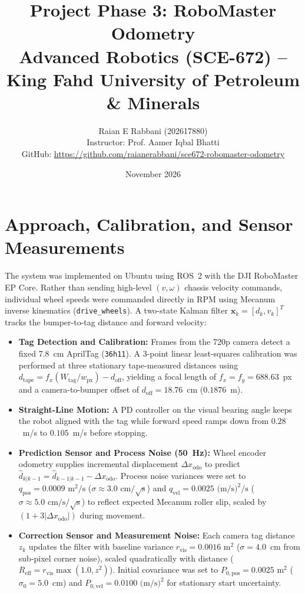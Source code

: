 \documentclass[10pt,a4paper]{article}
\title{\textbf{Project Phase 3: RoboMaster Odometry}\\[0.2em]
\normalsize Advanced Robotics (SCE-672) -- King Fahd University of Petroleum \& Minerals}
\author{Raian E Rabbani (202617880) \\
\small Instructor: Prof. Aamer Iqbal Bhatti \\
\small GitHub: \url{https://github.com/raianerabbani/sce672-robomaster-odometry}}
\date{November 2026}
\begin{document}
\maketitle

\section{Approach, Calibration, and Sensor Measurements}
The system was implemented on Ubuntu using ROS~2 with the DJI RoboMaster EP Core. Rather than sending high-level $(v, \omega)$ chassis velocity commands, individual wheel speeds were commanded directly in RPM using Mecanum inverse kinematics (\texttt{drive\_wheels}). A two-state Kalman filter $\mathbf{x}_k = [d_k, v_k]^T$ tracks the bumper-to-tag distance and forward velocity:
\begin{itemize}
    \item \textbf{Tag Detection and Calibration:} Frames from the 720p camera detect a fixed 7.8~cm AprilTag (\texttt{36h11}). A 3-point linear least-squares calibration was performed at three stationary tape-measured distances using $d_{\text{tape}} = f_x (W_{\text{tag}} / w_{\text{px}}) - d_{\text{off}}$, yielding a focal length of $f_x = f_y = 688.63$~px and a camera-to-bumper offset of $d_{\text{off}} = 18.76$~cm ($0.1876$~m).
    \item \textbf{Straight-Line Motion:} A PD controller on the visual bearing angle keeps the robot aligned with the tag while forward speed ramps down from $0.28$~m/s to $0.105$~m/s before stopping.
    \item \textbf{Prediction Sensor and Process Noise (50~Hz):} Wheel encoder odometry supplies incremental displacement $\Delta x_{\text{odo}}$ to predict $\hat{d}_{k|k-1} = \hat{d}_{k-1|k-1} - \Delta x_{\text{odo}}$. Process noise variances were set to $q_{\text{pos}} = 0.0009\text{ m}^2/\text{s}$ ($\sigma \approx 3.0\text{ cm}/\sqrt{\text{s}}$) and $q_{\text{vel}} = 0.0025\text{ (m/s)}^2/\text{s}$ ($\sigma \approx 5.0\text{ cm/s}/\sqrt{\text{s}}$) to reflect expected Mecanum roller slip, scaled by $(1 + 3|\Delta x_{\text{odo}}|)$ during movement.
    \item \textbf{Correction Sensor and Measurement Noise:} Each camera tag distance $z_k$ updates the filter with baseline variance $r_{\text{vis}} = 0.0016\text{ m}^2$ ($\sigma = 4.0$~cm from sub-pixel corner noise), scaled quadratically with distance ($R_{\text{eff}} = r_{\text{vis}} \max(1.0, z^2)$). Initial covariance was set to $P_{0,\text{pos}} = 0.0025\text{ m}^2$ ($\sigma_0 = 5.0$~cm) and $P_{0,\text{vel}} = 0.0100\text{ (m/s)}^2$ for stationary start uncertainty.
\end{itemize}
\end{document}
